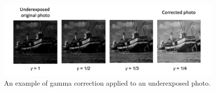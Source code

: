 \begin{figure}
    \centering
    \includegraphics[width=0.8\linewidth]{images/gamma-correction-2.png}
    \caption{An example of gamma correction applied to an underexposed photo.}
    \label{fig:gamma-correction-2}
\end{figure}
